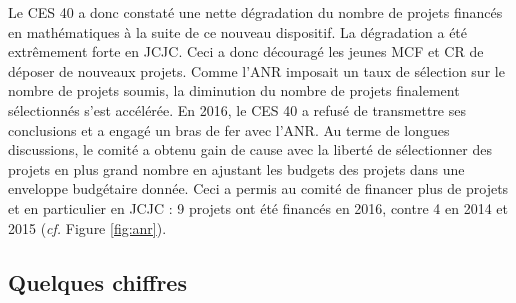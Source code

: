 Le CES 40 a donc constat\'e une nette d\'egradation du nombre de projets financ\'es en math\'ematiques \`a la suite de ce nouveau dispositif. La d\'egradation a \'et\'e extr\^emement forte en JCJC. Ceci a donc d\'ecourag\'e les jeunes MCF et CR de d\'eposer de nouveaux projets. Comme l'ANR imposait un taux de s\'election sur le nombre de projets soumis, la diminution du nombre de projets finalement s\'electionn\'es s'est acc\'el\'er\'ee. En 2016, le CES 40 a refus\'e de transmettre ses conclusions et a engag\'e un bras de fer avec l'ANR. Au terme de longues discussions, le comit\'e a obtenu gain de cause avec la libert\'e de s\'electionner des projets en plus grand nombre en ajustant les budgets des projets dans une enveloppe budg\'etaire donn\'ee. Ceci a permis au comit\'e de financer plus de projets et en particulier en JCJC : 9 projets ont \'et\'e financ\'es en 2016, contre 4 en 2014 et 2015 ({\em cf.} Figure \ref{fig:anr}).

\subsection*{Quelques chiffres}

